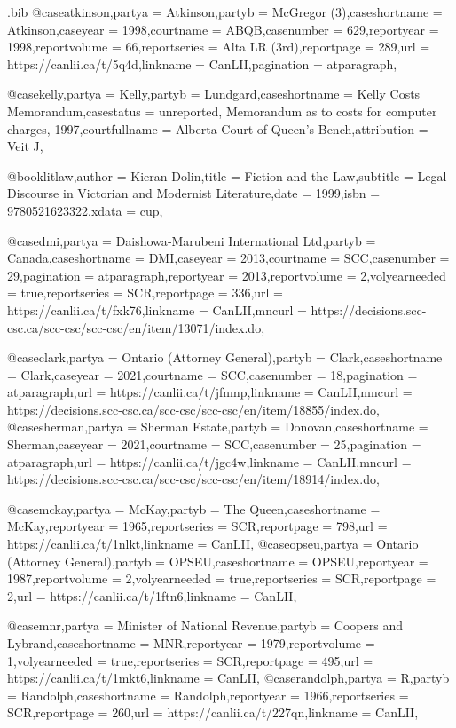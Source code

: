 \begin{filecontents*}[overwrite]{\jobname.bib}
@case{atkinson,partya =  {Atkinson},partyb =  {McGregor (3)},caseshortname =  {Atkinson},caseyear =  {1998},courtname =  {ABQB},casenumber =  {629},reportyear =  {1998},reportvolume =  {66},reportseries =  {Alta LR (3rd)},reportpage =  {289},url =  {https://canlii.ca/t/5q4d},linkname =  {CanLII},pagination =  {atparagraph},}


@case{kelly,partya =  {Kelly},partyb =  {Lundgard},caseshortname =  {Kelly Costs Memorandum},casestatus =  {unreported, Memorandum as to costs for computer charges, 1997},courtfullname =  {Alberta Court of Queen's Bench},attribution =  {Veit J},}

@book{litlaw,author =  {Kieran Dolin},title =  {Fiction and the Law},subtitle =  {Legal Discourse in Victorian and Modernist Literature},date =  {1999},isbn =  {9780521623322},xdata =  {cup},}

@case{dmi,partya =  {Daishowa‑Marubeni International Ltd},partyb =  {Canada},caseshortname =  {DMI},caseyear =  {2013},courtname =  {SCC},casenumber =  {29},pagination =  {atparagraph},reportyear =  {2013},reportvolume =  {2},volyearneeded =  {true},reportseries =  {SCR},reportpage =  {336},url =  {https://canlii.ca/t/fxk76},linkname =  {CanLII},mncurl =  {https://decisions.scc-csc.ca/scc-csc/scc-csc/en/item/13071/index.do},}


@case{clark,partya =  {Ontario (Attorney General)},partyb =  {Clark},caseshortname =  {Clark},caseyear =  {2021},courtname =  {SCC},casenumber =  {18},pagination =  {atparagraph},url =  {https://canlii.ca/t/jfnmp},linkname =  {CanLII},mncurl =  {https://decisions.scc-csc.ca/scc-csc/scc-csc/en/item/18855/index.do},}
@case{sherman,partya =  {Sherman Estate},partyb =  {Donovan},caseshortname =  {Sherman},caseyear =  {2021},courtname =  {SCC},casenumber =  {25},pagination =  {atparagraph},url =  {https://canlii.ca/t/jgc4w},linkname =  {CanLII},mncurl =  {https://decisions.scc-csc.ca/scc-csc/scc-csc/en/item/18914/index.do},}


@case{mckay,partya =  {McKay},partyb =  {The Queen},caseshortname =  {McKay},reportyear =  {1965},reportseries =  {SCR},reportpage =  {798},url =  {https://canlii.ca/t/1nlkt},linkname =  {CanLII},}
@case{opseu,partya =  {Ontario (Attorney General)},partyb =  {OPSEU},caseshortname =  {OPSEU},reportyear =  {1987},reportvolume =  {2},volyearneeded =  {true},reportseries =  {SCR},reportpage =  {2},url =  {https://canlii.ca/t/1ftn6},linkname =  {CanLII},}


@case{mnr,partya =  {Minister of National Revenue},partyb =  {Coopers and Lybrand},caseshortname =  {MNR},reportyear =  {1979},reportvolume =  {1},volyearneeded =  {true},reportseries =  {SCR},reportpage =  {495},url =  {https://canlii.ca/t/1mkt6},linkname =  {CanLII},}
@case{randolph,partya =  {R},partyb =  {Randolph},caseshortname =  {Randolph},reportyear =  {1966},reportseries =  {SCR},reportpage =  {260},url =  {https://canlii.ca/t/227qn},linkname =  {CanLII},}



\end{filecontents*}
